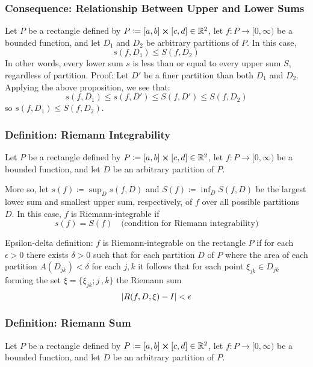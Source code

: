 \documentclass[11pt, a4paper]{article}
\begin{document}
\subsubsection{Consequence: Relationship Between Upper and Lower Sums}
Let $ P $ be a rectangle defined by $P \coloneqq [a, b] \cross [c, d] \in \mathbb{R}^2 $, let $ f : P \rightarrow [0, \infty)$ be a bounded function, and let $ D_1 $ and $ D_2 $ be arbitrary partitions of $ P $. In this case,
\begin{equation*}
	s(f, D_1) \leq S(f, D_2)
\end{equation*}
In other words, every lower sum $ s $ is less than or equal to every upper sum $ S $, regardless of partition.
Proof:
Let $ D' $ be a finer partition than both $ D_1 $ and $ D_2 $. Applying the above proposition, we see that:
\begin{equation*}
	s(f, D_1) \leq s(f, D') \leq S(f, D') \leq S(f, D_2)
\end{equation*}
so $ s(f, D_1) \leq S(f, D_2) $.

\subsubsection{Definition: Riemann Integrability}
Let $ P $ be a rectangle defined by $P \coloneqq [a, b] \cross [c, d] \in \mathbb{R}^2 $, let $ f : P \rightarrow [0, \infty)$ be a bounded function, and let $ D $ be an arbitrary partition of $ P $. 

More so, let $ s(f) \coloneqq \sup_D s(f, D) $ and $ S(f) \coloneqq \inf_D S(f, D) $ be the largest lower sum and smallest upper sum, respectively, of $ f $ over all possible partitions $ D $. In this case, $ f $ is Riemann-integrable if
\begin{equation*}
	s(f) = S(f) \quad \text{(condition for Riemann integrability)}
\end{equation*}

Epsilon-delta definition:
$ f $ is Riemann-integrable on the rectangle $ P $ if for each $ \epsilon > 0 $ there exists $ \delta > 0 $ such that for each partition $ D $ of $ P $ where the area of each partition $ A(D_{jk}) < \delta $ for each $ j, k $ it follows that for each point $ \xi_{jk} \in D_{jk} $ forming the set $ \xi = \{\xi_{jk}; j \, , k \} $ the Riemann sum
\begin{equation*}
 \abs{R(f, D, \xi) - I} < \epsilon
\end{equation*}

\subsubsection{Definition: Riemann Sum}
Let $ P $ be a rectangle defined by $P \coloneqq [a, b] \cross [c, d] \in \mathbb{R}^2 $, let $ f : P \rightarrow [0, \infty)$ be a bounded function, and let $ D $ be an arbitrary partition of $ P $. 
\end{document}
